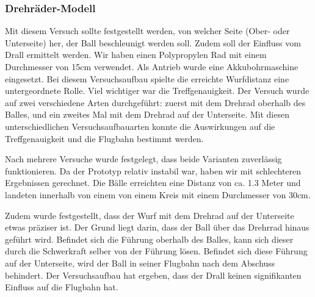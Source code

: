 \newpage
\subsubsection{Drehräder-Modell}
Mit diesem Versuch sollte festgestellt werden, von welcher Seite (Ober- oder Unterseite) her, der Ball beschleunigt werden soll. Zudem soll der Einfluss vom Drall ermittelt werden. Wir haben einen Polypropylen Rad mit einem Durchmesser von 15cm verwendet. Als Antrieb wurde eine Akkubohrmaschine eingesetzt. Bei diesem Versuchsaufbau spielte die erreichte Wurfdistanz eine untergeordnete Rolle. Viel wichtiger war die Treffgenauigkeit.  
Der Versuch wurde auf zwei verschiedene Arten durchgeführt: zuerst mit dem Drehrad oberhalb des Balles, und ein zweites Mal mit dem Drehrad auf der Unterseite. Mit diesen unterschiedlichen Versuchsaufbauarten konnte die Auswirkungen auf die Treffgenauigkeit und die Flugbahn bestimmt werden.

Nach mehrere Versuche wurde festgelegt, dass beide Varianten zuverlässig funktionieren. Da der Prototyp relativ instabil war, haben wir mit schlechteren Ergebnissen gerechnet. Die Bälle erreichten eine Distanz von ca. 1.3 Meter und landeten innerhalb von einem von einem Kreis mit einem Durchmesser von 30cm. 

Zudem wurde festgestellt, dass der Wurf mit dem Drehrad auf der Unterseite etwas präziser ist. Der Grund liegt darin, dass der Ball über das Drehrrad hinaus geführt wird. Befindet sich die Führung oberhalb des Balles, kann sich dieser durch die Schwerkraft selber von der Führung lösen. Befindet sich diese Führung auf der Unterseite, wird der Ball in seiner Flugbahn nach dem Abschuss behindert. Der Versuchsaufbau hat ergeben, dass der Drall keinen signifikanten Einfluss auf die Flugbahn hat.

